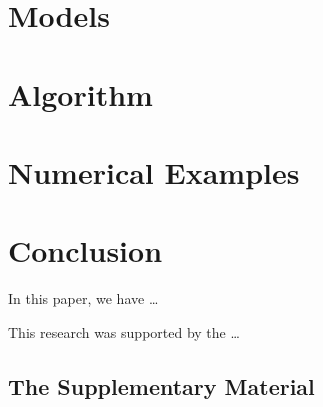 \documentclass[pdflatex, a4paper, default]{sn-jnl}
\begin{document}


\section{Models}\label{sec:sec-3}



\section{Algorithm}\label{sec:sec-4}



\section{Numerical Examples}\label{sec:sec-5}



\section{Conclusion}\label{sec:sec-6}
In this paper, we have \dots



\noindent This research was supported by the \dots
\begin{appendices}
    \section{The Supplementary Material}\label{sec:app-A}
\end{appendices}
% 


\end{document}
